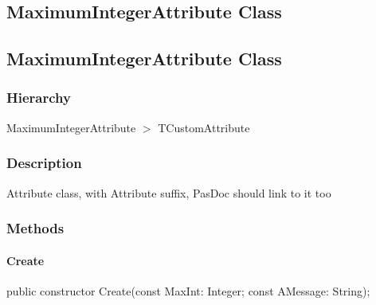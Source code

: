 \documentclass{report}
\newif\ifpdf
\begin{document}
\subsection*{\large{\textbf{MaximumIntegerAttribute Class}}\normalsize\hspace{1ex}\hrulefill}
\else
\subsection*{MaximumIntegerAttribute Class}
\fi
\label{ok_attributes.MaximumIntegerAttribute}
\subsubsection*{\large{\textbf{Hierarchy}}\normalsize\hspace{1ex}\hfill}
MaximumIntegerAttribute {$>$} TCustomAttribute
\subsubsection*{\large{\textbf{Description}}\normalsize\hspace{1ex}\hfill}
Attribute class, with Attribute suffix, PasDoc should link to it too\subsubsection*{\large{\textbf{Methods}}\normalsize\hspace{1ex}\hfill}
\paragraph*{Create}\hspace*{\fill}

\label{ok_attributes.MaximumIntegerAttribute-Create}
\begin{list}{}{
\setlength{\itemindent}{0cm}
\setlength{\listparindent}{0cm}
\setlength{\leftmargin}{\evensidemargin}
\addtolength{\leftmargin}{\tmplength}
\settowidth{\labelsep}{X}
\addtolength{\leftmargin}{\labelsep}
\setlength{\labelwidth}{\tmplength}
}
\item[\textbf{Declaration}\hfill]
\ifpdf
\begin{flushleft}
\fi
\begin{ttfamily}
public constructor Create(const MaxInt: Integer; const AMessage: String);\end{ttfamily}

\ifpdf
\end{flushleft}
\fi

\end{list}
\ifpdf
\end{document}
